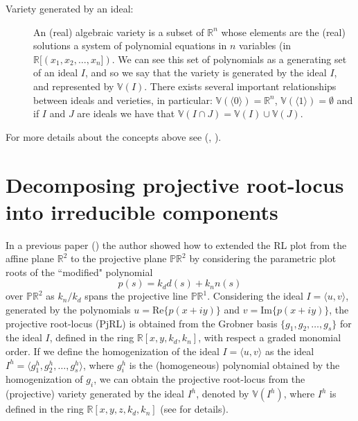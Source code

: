 \documentclass{article}
\begin{document}
\begin{description}
\item[Variety generated by an ideal:] An (real) algebraic variety is a subset of $\mathbb R^n$ 
whose elements are the (real) solutions a system of polynomial equations in $n$ variables
 (in $\mathbb R[(x_1,x_2,\ldots,x_n])$.
We can see this set of polynomials as a generating set of an ideal $I$, and so we say
that the variety is generated by the ideal $I$, and represented by $\mathbb V(I)$. 
There exists several important relationships between ideals and verieties, in particular: 
$\mathbb V(\langle 0\rangle)=\mathbb R^n$, $\mathbb V(\langle 1\rangle)=\emptyset$ and 
if $I$ and $J$ are ideals we have that $\mathbb V(I\cap J) = \mathbb V(I) \cup \mathbb V(J)$.

\end{description}
For more details about the concepts above see (\cite{clo}, \cite{am}).


\section{Decomposing projective root-locus into irreducible components}\label{ic}

In a previous paper (\cite{pjrl}) the author showed how to extended the RL plot 
from the affine plane $\mathbb R^2$ to the projective plane $\mathbb{PR}^2$
by considering the parametric plot roots of the ``modified" polynomial 
\begin{equation}\label{mpoly}
p(s) = k_dd(s)+k_nn(s)
\end{equation}
over $\mathbb{PR}^2$ as $k_n/k_d$ spans the 
projective line $\mathbb{PR}^1$. Considering the ideal $I=\langle u, v \rangle$, 
generated by the polynomials 
$u=\text{Re}\{p(x+iy)\}$ and $v=\text{Im}\{p(x+iy)\}$, 
the projective root-locus (PjRL) is obtained from the
Grobner basis $\{g_{1}, g_{2},\ldots, g_{s}\}$ for the ideal $I$, 
defined in the ring $\mathbb R[x,y,k_d,k_n]$, 
with respect a graded monomial order. If we define the homogenization
of the ideal $I=\langle u, v\rangle$ as the ideal 
$I^h=\langle g_{1}^h, g_{2}^h, \ldots, g_{s}^h\rangle$, where $g_{i}^h$ is the (homogeneous)
polynomial obtained by the homogenization of $g_{i}$, we can obtain the projective root-locus
from the (projective) variety generated by the ideal $I^h$, denoted by $\mathbb V(I^h) $,
where $I^h $ is defined in the ring 
$\mathbb R[x,y,z,k_d,k_n]$ (see \cite{pjrl} for details).
\end{document}
